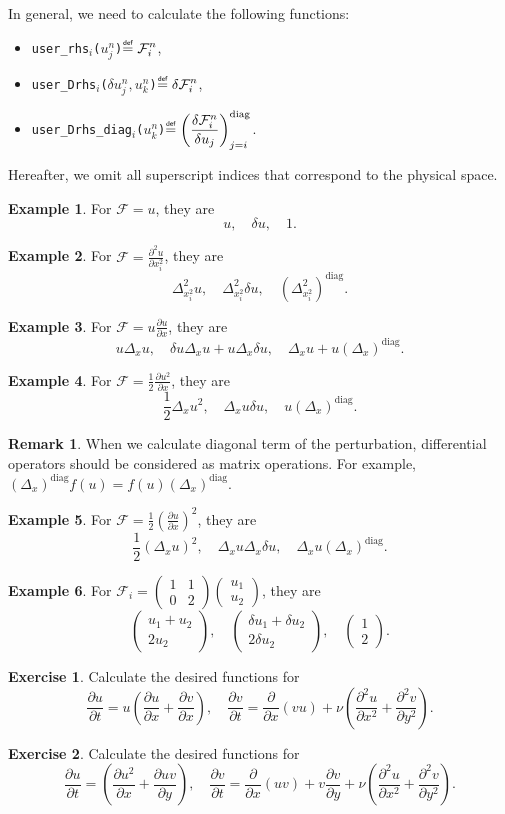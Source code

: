\documentclass{article}
\newcommand{\pder}[2][]{\frac{\partial#1}{\partial#2}}      %
\newcommand{\dder}[2][]{\Delta_{#2}#1}                      %
\newcommand{\vder}[2][]{\frac{\delta#1}{\delta#2}}          %
\newcommand{\pderdual}[2][]{\frac{\partial^2#1}{\partial#2^2}}
\newcommand{\dderdual}[2][]{\Delta^2_{#2^2}#1}
\newcommand{\FF}{\mathcal{F}}
\newcommand{\diag}[1]{\left(#1\right)^\mathrm{diag}}
\newcommand{\pert}[1]{\delta#1}
\newcommand{\eqdef}{\mathrel{\overset{\makebox[0pt]{\mbox{\normalfont\tiny\sffamily def}}}{=}}}
\newcommand{\matr}[4]{\begin{pmatrix} #1 & #2\\#3 & #4\end{pmatrix}}
\newcommand{\vect}[2]{\begin{pmatrix} #1\\#2\end{pmatrix}}
\newcommand{\func}[4]{\texttt{user\_#1\(_{#3}\)(\(#2\))}\(\eqdef\displaystyle#4\)}
\theoremstyle{definition}
\newtheorem{example}{Example}
\newtheorem{remark}{Remark}
\newtheorem{exercise}{Exercise}
\begin{document}
In general, we need to calculate the following functions:
\begin{itemize}
    \item \func{rhs}{u_j^n}{i}{ \FF_i^n },
    \item \func{Drhs}{\pert{u_j^n},u_k^n}{i}{ \pert{\FF_i^n} },
    \item \func{Drhs\_diag}{u_k^n}{i}{ \diag{\vder[\FF_i^n]{u_j}}_{j=i}}.
\end{itemize}
Hereafter, we omit all superscript indices that correspond to the physical space.
\begin{example}
    For \(\FF = u\), they are \[
        u, \quad \pert{u}, \quad 1.
    \]
\end{example}
\begin{example}
    For \(\FF = \pderdual[u]{x_i}\), they are \[
        \dderdual[u]{x_i}, \quad \dderdual[\pert{u}]{x_i}, \quad \diag{\dderdual{x_i}}.
    \]
\end{example}
\begin{example}
    For \(\FF = u\pder[u]{x}\), they are \[
        u\dder[u]{x}, \quad \pert{u}\dder[u]{x} + u\dder[\pert{u}]{x},
        \quad \dder[u]{x} + u \diag{\dder{x}}.
    \]
\end{example}
\begin{example}
    For \(\FF = \frac12\pder[u^2]{x}\), they are \[
        \frac12\dder[u^2]{x}, \quad \dder[u\pert{u}]{x}, \quad u\diag{\dder{x}}.
    \]
\end{example}
\begin{remark}
    When we calculate diagonal term of the perturbation,
    differential operators should be considered as matrix operations.
    For example, \(\diag{\dder{x}} f(u) = f(u)\diag{\dder{x}}\).
\end{remark}
\begin{example}
    For \(\FF = \frac12\left(\pder[u]{x}\right)^2\), they are \[
        \frac12\left(\dder[u]{x}\right)^2, \quad \dder[u]{x}\dder[\pert{u}]{x},
        \quad \dder[u]{x}\diag{\dder{x}}.
    \]
\end{example}
\begin{example}
    For \(\FF_i = \matr1102\vect{u_1}{u_2}\), they are \[
        \vect{u_1+u_2}{2u_2}, \quad
        \vect{\pert{u_1}+\pert{u_2}}{2\pert{u_2}}, \quad
        \vect{1}{2}.
    \]
\end{example}

\begin{exercise}
    Calculate the desired functions for \[
        \pder[u]{t} = u\left(\pder[u]{x} + \pder[v]{x}\right), \quad
        \pder[v]{t} = \pder{x}(vu) + \nu\left(\pderdual[u]{x}+\pderdual[v]{y}\right).
    \]
\end{exercise}

\begin{exercise}
    Calculate the desired functions for \[
        \pder[u]{t} = \left(\pder[u^2]{x} + \pder[uv]{y}\right), \quad
        \pder[v]{t} = \pder{x}(uv) + v \pder[v]{y} + \nu\left(\pderdual[u]{x}+\pderdual[v]{y}\right).
    \]
\end{exercise}
\end{document}
